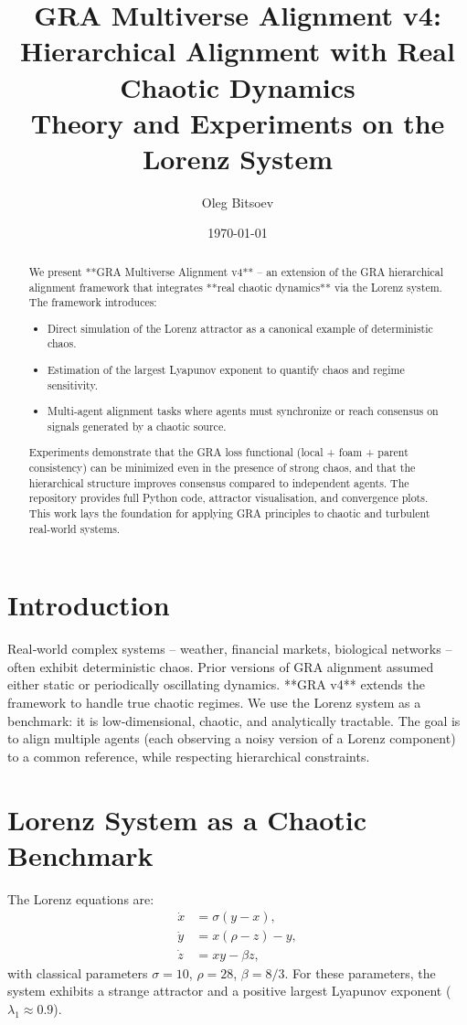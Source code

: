 \documentclass[12pt,a4paper]{article}
\title{GRA Multiverse Alignment v4: Hierarchical Alignment with Real Chaotic Dynamics \\ Theory and Experiments on the Lorenz System}
\author{Oleg Bitsoev}
\date{\today}
\begin{document}
\maketitle

\begin{abstract}
We present **GRA Multiverse Alignment v4** – an extension of the GRA hierarchical alignment framework that integrates **real chaotic dynamics** via the Lorenz system. The framework introduces:
\begin{itemize}
    \item Direct simulation of the Lorenz attractor as a canonical example of deterministic chaos.
    \item Estimation of the largest Lyapunov exponent to quantify chaos and regime sensitivity.
    \item Multi‑agent alignment tasks where agents must synchronize or reach consensus on signals generated by a chaotic source.
\end{itemize}
Experiments demonstrate that the GRA loss functional (local + foam + parent consistency) can be minimized even in the presence of strong chaos, and that the hierarchical structure improves consensus compared to independent agents. The repository provides full Python code, attractor visualisation, and convergence plots. This work lays the foundation for applying GRA principles to chaotic and turbulent real‑world systems.
\end{abstract}

\section{Introduction}
Real‑world complex systems – weather, financial markets, biological networks – often exhibit deterministic chaos. Prior versions of GRA alignment assumed either static or periodically oscillating dynamics. **GRA v4** extends the framework to handle true chaotic regimes. We use the Lorenz system as a benchmark: it is low‑dimensional, chaotic, and analytically tractable. The goal is to align multiple agents (each observing a noisy version of a Lorenz component) to a common reference, while respecting hierarchical constraints.

\section{Lorenz System as a Chaotic Benchmark}
The Lorenz equations are:
\[
\begin{aligned}
\dot{x} &= \sigma (y - x), \\
\dot{y} &= x (\rho - z) - y, \\
\dot{z} &= xy - \beta z,
\end{aligned}
\]
with classical parameters \(\sigma = 10\), \(\rho = 28\), \(\beta = 8/3\). For these parameters, the system exhibits a strange attractor and a positive largest Lyapunov exponent (\(\lambda_1 \approx 0.9\)).
\end{document}
